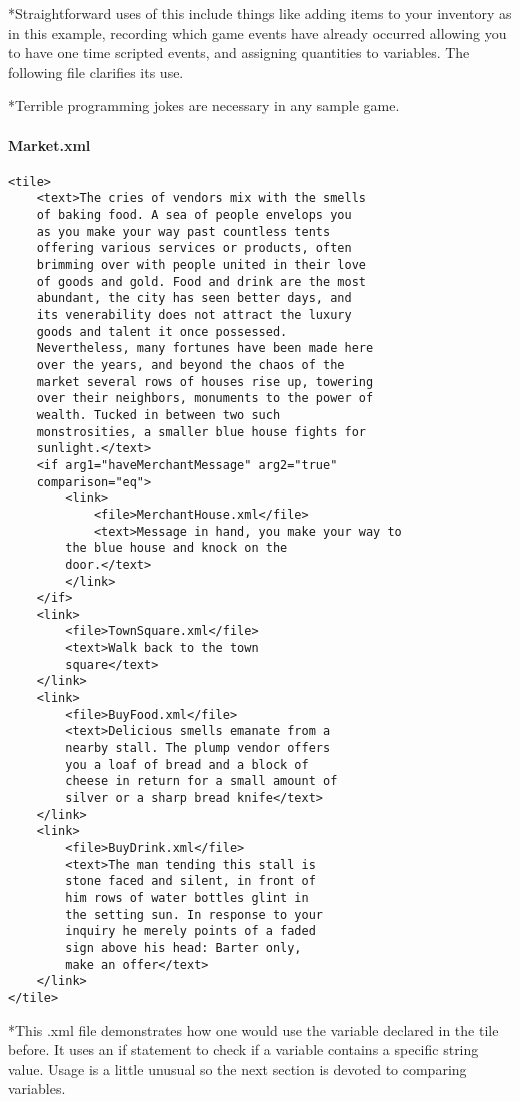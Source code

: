 \documentclass[11pt]{article}
\begin{document}
*Straightforward uses of this include things like adding items to your inventory as in this example, recording which game events have already occurred allowing you to have one time scripted events, and assigning quantities to variables. The following file clarifies its use.

*Terrible programming jokes are necessary in any sample game.


\paragraph{Market.xml}

\begin{lstlisting}[frame=single]
<tile>
	<text>The cries of vendors mix with the smells 
	of baking food. A sea of people envelops you 
	as you make your way past countless tents 
	offering various services or products, often 
	brimming over with people united in their love 
	of goods and gold. Food and drink are the most 
	abundant, the city has seen better days, and 
	its venerability does not attract the luxury 
	goods and talent it once possessed. 
	Nevertheless, many fortunes have been made here 
	over the years, and beyond the chaos of the 
	market several rows of houses rise up, towering 
	over their neighbors, monuments to the power of 
	wealth. Tucked in between two such 
	monstrosities, a smaller blue house fights for 
	sunlight.</text>
	<if arg1="haveMerchantMessage" arg2="true" 
	comparison="eq">
        <link>
            <file>MerchantHouse.xml</file>
            <text>Message in hand, you make your way to 
		the blue house and knock on the 
		door.</text>
        </link>
	</if>
	<link>
		<file>TownSquare.xml</file>
		<text>Walk back to the town 
		square</text>
	</link>
	<link>
		<file>BuyFood.xml</file>
		<text>Delicious smells emanate from a 
		nearby stall. The plump vendor offers 
		you a loaf of bread and a block of 
		cheese in return for a small amount of 
		silver or a sharp bread knife</text>
	</link>
	<link>
		<file>BuyDrink.xml</file>
		<text>The man tending this stall is 
		stone faced and silent, in front of 
		him rows of water bottles glint in 
		the setting sun. In response to your 
		inquiry he merely points of a faded 
		sign above his head: Barter only, 
		make an offer</text>
	</link>
</tile>
\end{lstlisting}
*This .xml file demonstrates how one would use the variable declared in the tile before. It uses an if statement to check if a variable contains a specific string value. Usage is a little unusual so the next section is devoted to comparing variables.
\end{document}
